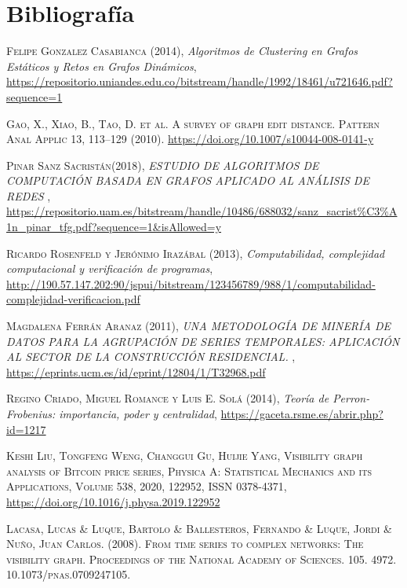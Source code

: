 \documentclass[12pt,a4paper]{article}
\begin{document}
	\section{Bibliografía}
	 \renewcommand\refname{}
\begin{thebibliography}{X}


 \textsc{Felipe Gonzalez Casabianca} \textsc{(2014)},
\textit{Algoritmos de Clustering en Grafos
Estáticos y Retos en Grafos Dinámicos}, \url{https://repositorio.uniandes.edu.co/bitstream/handle/1992/18461/u721646.pdf?sequence=1}

 \textsc{Gao, X., Xiao, B., Tao, D. et al. A survey of graph edit distance. Pattern Anal Applic 13, 113–129 (2010).} \url{https://doi.org/10.1007/s10044-008-0141-y}

 \textsc{ Pinar Sanz Sacristán}\textsc{(2018)},
\textit{ESTUDIO DE ALGORITMOS DE
COMPUTACIÓN BASADA EN
GRAFOS APLICADO AL
ANÁLISIS DE REDES
}, \url{https://repositorio.uam.es/bitstream/handle/10486/688032/sanz_sacrist%C3%A1n_pinar_tfg.pdf?sequence=1&isAllowed=y}

 \textsc{Ricardo Rosenfeld y Jerónimo Irazábal} \textsc{(2013)},
\textit{Computabilidad, complejidad
computacional y verificación
de programas}, \url{http://190.57.147.202:90/jspui/bitstream/123456789/988/1/computabilidad-complejidad-verificacion.pdf}

 \textsc{Magdalena Ferrán Aranaz} \textsc{(2011)},
\textit{UNA METODOLOGÍA DE MINERÍA DE DATOS
PARA LA AGRUPACIÓN DE SERIES
TEMPORALES: APLICACIÓN AL SECTOR DE LA
CONSTRUCCIÓN RESIDENCIAL. 
}, \url{https://eprints.ucm.es/id/eprint/12804/1/T32968.pdf}

 \textsc{Regino Criado, Miguel Romance y Luis E. Solá} \textsc{(2014)},
\textit{Teoría de Perron-Frobenius:
importancia, poder y centralidad}, \url{https://gaceta.rsme.es/abrir.php?id=1217}

 \textsc{Keshi Liu, Tongfeng Weng, Changgui Gu, Huijie Yang,
Visibility graph analysis of Bitcoin price series,
Physica A: Statistical Mechanics and its Applications,
Volume 538,
2020,
122952,
ISSN 0378-4371,}
\url{https://doi.org/10.1016/j.physa.2019.122952}

 \textsc{Lacasa, Lucas \& Luque, Bartolo \& Ballesteros, Fernando \& Luque, Jordi \& Nuño, Juan Carlos. (2008). From time series to complex networks: The visibility graph. Proceedings of the National Academy of Sciences. 105. 4972. 10.1073/pnas.0709247105.}


\end{thebibliography}
\end{document}
